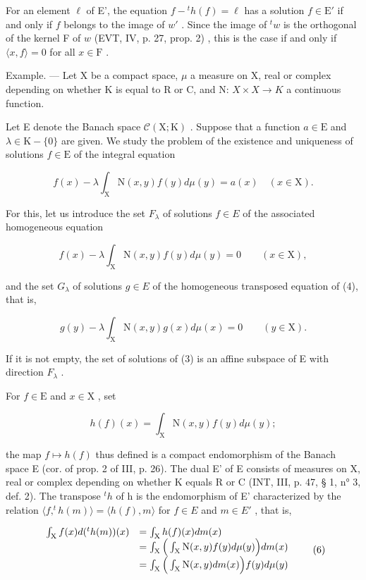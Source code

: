 For an element \(\ell\) of E', the equation \(f - {}^t h(f) = \ell\) has a solution \(f \in \mathrm{E}'\) if and only if \(f\) belongs to the image of \(w'\) . Since the image of \({}^t w\) is the orthogonal of the kernel F of \(w\) (EVT, IV, p. 27, prop. 2) , this is the case if and only if \(\langle x, f \rangle = 0\) for all \(x \in \mathrm{F}\) .

Example. --- Let X be a compact space, \(\mu\) a measure on X, real or complex depending on whether K is equal to R or C, and N: \(X \times X \to K\) a continuous function.

Let E denote the Banach space \(\mathcal{C}(\mathrm{X};\mathrm{K})\) . Suppose that a function \(a\in\mathrm{E}\) and \(\lambda\in\mathrm{K}-\{0\}\) are given. We study the problem of the existence and uniqueness of solutions \(f\in\mathrm{E}\) of the integral equation

\[
f (x) - \lambda \int_ {\mathrm{X}} \mathrm{N} (x, y) f (y) d \mu (y) = a (x) \quad (x \in \mathrm{X}).\tag{3}
\]

For this, let us introduce the set \(F_{\lambda}\) of solutions \(f \in E\) of the associated homogeneous equation

\[
f (x) - \lambda \int_ {\mathrm{X}} \mathrm{N} (x, y) f (y) d \mu (y) = 0 \qquad (x \in \mathrm{X}),\tag{4}
\]

and the set \(G_{\lambda}\) of solutions \(g \in E\) of the homogeneous transposed equation of (4), that is,

\[
g (y) - \lambda \int_ {\mathrm{X}} \mathrm{N} (x, y) g (x) d \mu (x) = 0 \qquad (y \in \mathrm{X}).\tag{5}
\]

If it is not empty, the set of solutions of (3) is an affine subspace of E with direction \(F_{\lambda}\) .

For \(f\in \mathrm{E}\) and \(x\in \mathrm{X}\) , set

\[
h (f) (x) = \int_ {\mathrm{X}} \mathrm{N} (x, y) f (y) d \mu (y);
\]

the map \(f \mapsto h(f)\) thus defined is a compact endomorphism of the Banach space E (cor. of prop. 2 of III, p. 26). The dual E' of E consists of measures on X, real or complex depending on whether K equals R or C (INT, III, p. 47, § 1, n° 3, def. 2). The transpose \(^{t}h\) of h is the endomorphism of E' characterized by the relation \(\langle f, ^{t}h(m)\rangle = \langle h(f), m\rangle\) for \(f \in E\) and \(m \in E'\) , that is,

\[
\begin{array}{r l} \int_ {\mathrm{X}} f (x) d (^ {t} h (m)) (x) & = \int_ {\mathrm{X}} h (f) (x) d m (x) \\ & = \int_ {\mathrm{X}} \Big (\int_ {\mathrm{X}} \mathrm{N} (x, y) f (y) d \mu (y) \Big) d m (x) \\ & = \int_ {\mathrm{X}} \Big (\int_ {\mathrm{X}} \mathrm{N} (x, y) d m (x) \Big) f (y) d \mu (y) \end{array}\tag{6}
\]

